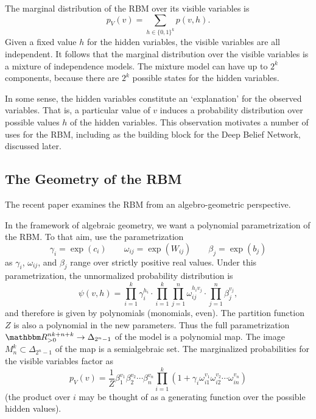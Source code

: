 \documentclass[11pt,titlepage]{article}
\begin{document}
    The marginal distribution of the RBM over its visible variables is
    \[
        p_V(v) = \sum_{h \in \{0,1\}^k} p(v, h).
    \]
    Given a fixed value $h$ for the hidden variables, the visible variables are
    all independent.  It follows that the marginal distribution over the visible
    variables is a mixture of independence models.  The mixture model can have
    up to $2^k$ components, because there are $2^k$ possible states for the
    hidden variables.

    In some sense, the hidden variables constitute an `explanation' for the
    observed variables.  That is, a particular value of $v$ induces a
    probability distribution over possible values $h$ of the hidden variables.
    This observation motivates a number of uses for the RBM, including as the
    building block for the Deep Belief Network, discussed later.

\subsection{The Geometry of the RBM}
    The recent paper \cite{CMS09} examines the RBM from an algebro-geometric
    perspective.
    
    In the framework of algebraic geometry, we want a polynomial parametrization
    of the RBM.  To that aim, use the parametrization
    \[
        \gamma_i = \exp(c_i)
        \qquad
        \omega_{ij} = \exp(W_{ij})
        \qquad
        \beta_j = \exp(b_j)
    \]
    as $\gamma_i$, $\omega_{ij}$, and $\beta_j$ range over strictly positive
    real values.  Under this parametrization, the unnormalized probability
    distribution is
    \[
        \psi(v, h) = \prod_{i=1}^k \gamma_i^{h_i}
            \cdot 
            \prod_{i=1}^k \prod_{j=1}^n \omega_{ij}^{h_i v_j}
            \cdot
            \prod_{j=1}^n \beta_j^{v_j},
    \]
    and therefore is given by polynomials (monomials, even).  The partition
    function $Z$ is also a polynomial in the new parameters.  Thus the full
    parametrization $\R_{>0}^{nk+n+k} \to \Delta_{2^n-1}$ of the model is a
    polynomial map.  The image $M_n^k \subset \Delta_{2^n - 1}$ of the map is a
    semialgebraic set.  The marginalized probabilities for the visible variables
    factor as
    \[
        p_V(v) = \frac 1 Z
        \beta_1^{v_1} \beta_2^{v_2} \cdots \beta_n^{v_n} 
        \prod_{i=1}^k(1 +
        \gamma_i 
        \omega_{i1}^{v_1}
        \omega_{i2}^{v_2}
        \cdots
        \omega_{in}^{v_n}
        )
    \]
    (the product over $i$ may be thought of as a generating function over
    the possible hidden values).
\end{document}
